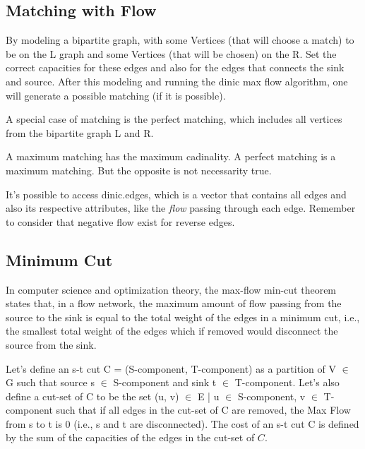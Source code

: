 \subsection{Matching with Flow}

\vspace{12 pt}

	By modeling a bipartite graph, with some Vertices 
	(that will choose a match) 
	to be on the L graph and some Vertices (that will be chosen) on the R.
	Set the correct capacities for these edges 
	and also for the edges that connects the sink and source. 
	After this modeling
	and running the dinic max flow algorithm, 
	one will generate a possible matching (if it is possible).


	A special case of matching is the perfect matching, 
	which includes all vertices from the bipartite graph L and R.

	A maximum matching has the maximum cadinality. 
	A perfect matching is a maximum matching. 
	But the opposite is not necessarity true.

	It's possible to access dinic.edges, 
	which is a vector that contains all edges and also its 
	respective attributes, 
	like the \textit{flow} passing through each edge. 
	Remember to consider that negative flow exist for reverse edges.

\vspace{1pt}

\subsection{Minimum Cut}

\vspace{12pt}

In computer science and optimization theory, the max-flow min-cut theorem states that, in a flow network, 
the maximum amount of flow passing from the source to the sink is equal to the total weight of the edges 
in a minimum cut, i.e., the smallest total weight of the edges which if removed would disconnect the source from the sink. 

{Let's define an s-t cut C = (S-component, T-component) as a partition of V $\in$ G such that 
source s $\in$ S-component and sink t $\in$ T-component. Let's also define a cut-set of C to be the set 
(u, v) $\in$ E | u $\in$ S-component, v $\in$ T-component such that if all edges in the cut-set of C are removed,
the Max Flow from s to t is 0 (i.e., s and t are disconnected). The cost of an s-t cut C is defined by the sum
of the capacities of the edges in the cut-set of $C$.}

